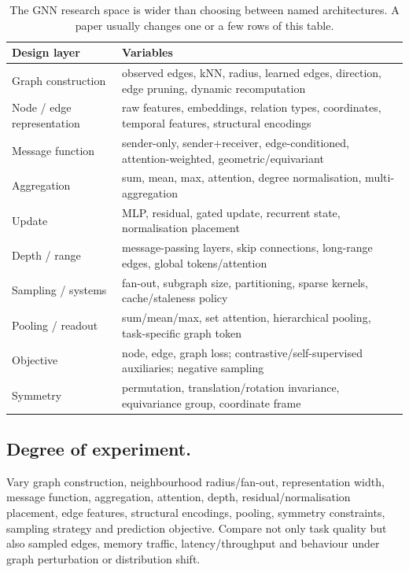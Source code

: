 \begin{table}[htbp]
\centering
\small
\begin{tabular}{p{}p{}}
\toprule
Design layer & Variables \\
\midrule
Graph construction & observed edges, kNN, radius, learned edges, direction, edge pruning, dynamic recomputation \\
Node / edge representation & raw features, embeddings, relation types, coordinates, temporal features, structural encodings \\
Message function & sender-only, sender+receiver, edge-conditioned, attention-weighted, geometric/equivariant \\
Aggregation & sum, mean, max, attention, degree normalisation, multi-aggregation \\
Update & MLP, residual, gated update, recurrent state, normalisation placement \\
Depth / range & message-passing layers, skip connections, long-range edges, global tokens/attention \\
Sampling / systems & fan-out, subgraph size, partitioning, sparse kernels, cache/staleness policy \\
Pooling / readout & sum/mean/max, set attention, hierarchical pooling, task-specific graph token \\
Objective & node, edge, graph loss; contrastive/self-supervised auxiliaries; negative sampling \\
Symmetry & permutation, translation/rotation invariance, equivariance group, coordinate frame \\
\bottomrule
\end{tabular}
\caption{The GNN research space is wider than choosing between named architectures. A paper usually changes one or a few rows of this table.}
\label{tab:gnn-optionality}
\end{table}

\subsection{Degree of experiment.}
Vary graph construction, neighbourhood radius/fan-out, representation width, message function, aggregation, attention, depth, residual/normalisation placement, edge features, structural encodings, pooling, symmetry constraints, sampling strategy and prediction objective.
Compare not only task quality but also sampled edges, memory traffic, latency/throughput and behaviour under graph perturbation or distribution shift.

